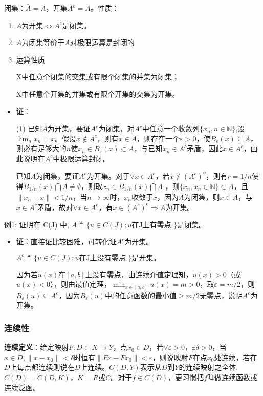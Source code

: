 \documentclass[12pt,a4paper]{article}
\begin{document}
闭集：$\bar{A}=A$，开集$A^o=A$。性质：
\begin{enumerate}
	\item $A$为开集$\Leftrightarrow A^c$是闭集。
	\item $A$为闭集等价于$A$对极限运算是封闭的
	\item 运算性质
	
	          X中任意个闭集的交集或有限个闭集的并集为闭集；
	          
          X中任意个开集的并集或有限个开集的交集为开集。
\end{enumerate}
\begin{itemize}
	\item []
	\textbf{证}：
	
	(1) 已知$A$为开集，要证$A^c$为闭集，对$A^c$中任意一个收敛列$\{x_n,n\in \mathbb{N}\}$,设$\lim_nx_n=x$。假设$x\notin A^c$，则有$x\in A$，则存在一个$\varepsilon>0$，使$B_\varepsilon(x)\subseteq A$，则必有足够大的$n$使$x_n\in B_\varepsilon(x)\subset A$，与已知$x_n\in A^c$矛盾，因此$x\in A^c$，由此说明在$A^c$中极限运算封闭。

		已知$A$为闭集，要证$A^c$为开集。对于$\forall x\in A^c$，若$x\notin (A^c)^o$，则有$r=1/n$使得$B_{1/n}(x)\bigcap A\neq \emptyset$，则取$x_n\in B_{1/n}(x)\bigcap A$	，则$\{x_n,x_n\in \mathbb{N}\}\subset  A$，且$\|x_n-x\|<1/n$，当$n\rightarrow \infty$时，$x_n$收敛于$x$，因为$A$为闭集，则$x\in A$，与$x\in A^c$矛盾，故对$\forall x\in A^c$，有$x\in (A^c)^o\Rightarrow$$A$为开集。
\end{itemize}

 例1: 证明在 C(J) 中, $A \triangleq\{u \in C(J): u \text{在J上有零点 }\} \text{是闭集。}$
 \begin{itemize}
 	\item []
 	\textbf{证}：直接证比较困难，可转化证$A^c$为开集。
 	
 	$A^c \triangleq\{u \in C(J): u \text{在J上没有零点 }\} \text{是开集。}$
 	
 	因为若$u(x)$在$[a,b]$上没有零点，由连续介值定理知，$u(x)>0$（或$u(x)<0$），则由最值定理，$\min_{x\in[a,b]}u(x)=m>0$，取$\varepsilon=m/2$，则$B_{\varepsilon}(u)\subseteq A^c$，因为$B_{\varepsilon}(u)$中的任意函数的最小值$\geq m/2$无零点，说明$A^c$为开集。
 \end{itemize}
\subsubsection{连续性}
\textbf{连续定义}：给定映射$F:D\subset X\rightarrow Y$，点$x_0\in D$，若$\forall \varepsilon>0$，$\exists\delta>0$，当$x\in D,\|x-x_0\|<\delta$时恒有$\|Fx-Fx_0\|<\varepsilon$，则说映射$F$在点$x_0$处连续，若在$D$上每点都连续则说在$D$上连续。$C(D,Y)$表示从$D$到$Y$的连续映射之全体,$C(D)=C(D,K)$，$K=R$或$C$。对于$f\in C(D)$，更习惯把$f$叫做连续函数或连续泛函。
\end{document}

